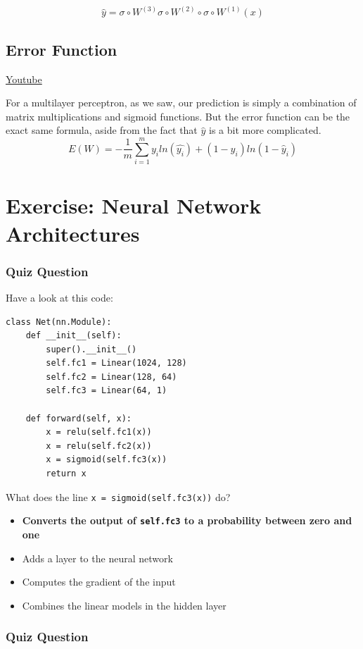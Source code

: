\[\hat{y} = \sigma \circ W^{(3)} \sigma \circ W^{(2)} \circ \sigma \circ W^{(1)}(x)\]

\subsection{Error Function}
\href{https://www.youtube.com/watch?v=SC1wEW7TtKs&ab_channel=Udacity}{Youtube} \newline

For a multilayer perceptron, as we saw, our prediction is simply a combination of matrix multiplications and sigmoid functions. But the error function can be the exact same formula, aside from the fact that \(\hat{y}\) is a bit more complicated. \[E(W) = -\frac{1}{m} \sum_{i=1}^m y_iln(\hat{y_i}) + (1-y_i) ln(1-\hat{y}_i)\]


\section{Exercise: Neural Network Architectures}

\subsubsection{Quiz Question}

Have a look at this code:
\begin{lstlisting}
class Net(nn.Module):
    def __init__(self):
        super().__init__()
        self.fc1 = Linear(1024, 128)
        self.fc2 = Linear(128, 64)
        self.fc3 = Linear(64, 1)

    def forward(self, x):
        x = relu(self.fc1(x))
        x = relu(self.fc2(x))
        x = sigmoid(self.fc3(x))
        return x
\end{lstlisting}
What does the line \verb|x = sigmoid(self.fc3(x))| do?
\begin{itemize}
    \item \textbf{Converts the output of \lstinline{self.fc3} to a probability between zero and one}
    \item Adds a layer to the neural network
    \item Computes the gradient of the input
    \item Combines the linear models in the hidden layer
\end{itemize}

\subsubsection{Quiz Question}

